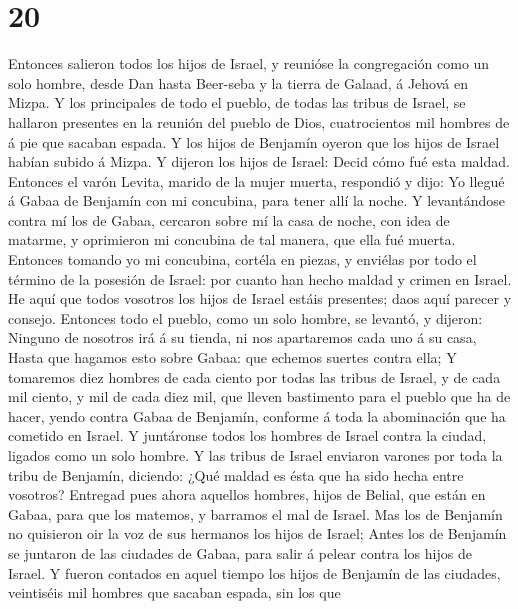 \hypertarget{section-19}{%
\section{20}\label{section-19}}

 Entonces salieron todos los hijos de Israel, y reunióse la
congregación como un solo hombre, desde Dan hasta Beer-seba y la tierra
de Galaad, á Jehová en Mizpa.  Y los principales de todo el
pueblo, de todas las tribus de Israel, se hallaron presentes en la
reunión del pueblo de Dios, cuatrocientos mil hombres de á pie que
sacaban espada.  Y los hijos de Benjamín oyeron que los
hijos de Israel habían subido á Mizpa. Y dijeron los hijos de Israel:
Decid cómo fué esta maldad.  Entonces el varón Levita,
marido de la mujer muerta, respondió y dijo: Yo llegué á Gabaa de
Benjamín con mi concubina, para tener allí la noche.  Y
levantándose contra mí los de Gabaa, cercaron sobre mí la casa de noche,
con idea de matarme, y oprimieron mi concubina de tal manera, que ella
fué muerta.  Entonces tomando yo mi concubina, cortéla en
piezas, y enviélas por todo el término de la posesión de Israel: por
cuanto han hecho maldad y crimen en Israel.  He aquí que
todos vosotros los hijos de Israel estáis presentes; daos aquí parecer y
consejo.  Entonces todo el pueblo, como un solo hombre, se
levantó, y dijeron: Ninguno de nosotros irá á su tienda, ni nos
apartaremos cada uno á su casa,  Hasta que hagamos esto
sobre Gabaa: que echemos suertes contra ella;  Y tomaremos
diez hombres de cada ciento por todas las tribus de Israel, y de cada
mil ciento, y mil de cada diez mil, que lleven bastimento para el pueblo
que ha de hacer, yendo contra Gabaa de Benjamín, conforme á toda la
abominación que ha cometido en Israel.  Y juntáronse todos
los hombres de Israel contra la ciudad, ligados como un solo hombre.
 Y las tribus de Israel enviaron varones por toda la tribu
de Benjamín, diciendo: ¿Qué maldad es ésta que ha sido hecha entre
vosotros?  Entregad pues ahora aquellos hombres, hijos de
Belial, que están en Gabaa, para que los matemos, y barramos el mal de
Israel. Mas los de Benjamín no quisieron oir la voz de sus hermanos los
hijos de Israel;  Antes los de Benjamín se juntaron de las
ciudades de Gabaa, para salir á pelear contra los hijos de Israel.
 Y fueron contados en aquel tiempo los hijos de Benjamín de
las ciudades, veintiséis mil hombres que sacaban espada, sin los que
